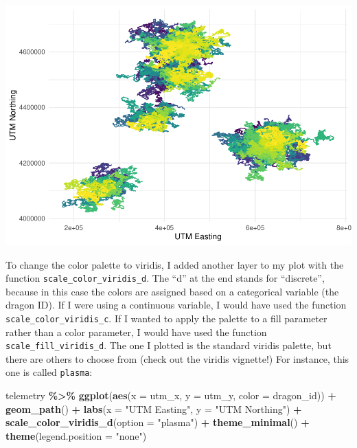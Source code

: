 \documentclass[
]{book}
\newenvironment{Shaded}{\begin{snugshade}}{\end{snugshade}}
\newcommand{\AttributeTok}[1]{\textcolor[rgb]{0.13,0.29,0.53}{#1}}
\newcommand{\FunctionTok}[1]{\textcolor[rgb]{0.13,0.29,0.53}{\textbf{#1}}}
\newcommand{\NormalTok}[1]{#1}
\newcommand{\SpecialCharTok}[1]{\textcolor[rgb]{0.81,0.36,0.00}{\textbf{#1}}}
\newcommand{\StringTok}[1]{\textcolor[rgb]{0.31,0.60,0.02}{#1}}
\begin{document}
\includegraphics{reproducible-science_files/figure-latex/gg31b-1.pdf}

To change the color palette to viridis, I added another layer to my plot with
the function \texttt{scale\_color\_viridis\_d}. The ``d'' at the end stands for ``discrete'',
because in this case the colors are assigned based on a categorical variable
(the dragon ID). If I were using a continuous variable, I would have used the
function \texttt{scale\_color\_viridis\_c}. If I wanted to apply the palette to a fill
parameter rather than a color parameter, I would have used the function
\texttt{scale\_fill\_viridis\_d}. The one I plotted is the standard viridis palette, but
there are others to choose from (check out the viridis vignette!) For instance,
this one is called \texttt{plasma}:

\begin{Shaded}
\begin{Highlighting}[]
\NormalTok{telemetry }\SpecialCharTok{\%\textgreater{}\%} 
  \FunctionTok{ggplot}\NormalTok{(}\FunctionTok{aes}\NormalTok{(}\AttributeTok{x =}\NormalTok{ utm\_x, }\AttributeTok{y =}\NormalTok{ utm\_y, }\AttributeTok{color =}\NormalTok{ dragon\_id)) }\SpecialCharTok{+}
  \FunctionTok{geom\_path}\NormalTok{() }\SpecialCharTok{+}
  \FunctionTok{labs}\NormalTok{(}\AttributeTok{x =} \StringTok{"UTM Easting"}\NormalTok{, }\AttributeTok{y =} \StringTok{"UTM Northing"}\NormalTok{) }\SpecialCharTok{+}
  \FunctionTok{scale\_color\_viridis\_d}\NormalTok{(}\AttributeTok{option =} \StringTok{"plasma"}\NormalTok{) }\SpecialCharTok{+}
  \FunctionTok{theme\_minimal}\NormalTok{() }\SpecialCharTok{+}
  \FunctionTok{theme}\NormalTok{(}\AttributeTok{legend.position =} \StringTok{"none"}\NormalTok{)}
\end{Highlighting}
\end{Shaded}
\end{document}

